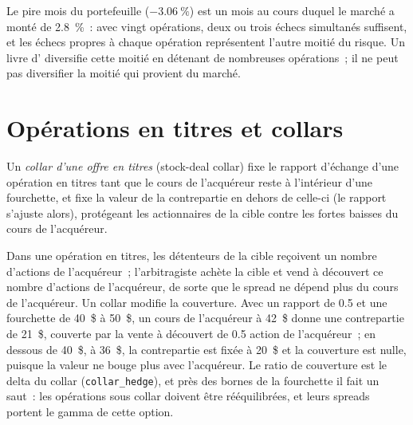 \begin{omfigure}

\label{fig:s1:merger-arbitrage:months}
\end{omfigure}

Le pire mois du portefeuille ($-3.06~\%$) est un mois au cours duquel le marché a monté de 2.8~\%~: avec vingt opérations, deux ou trois échecs simultanés suffisent, et
les échecs propres à chaque opération représentent l'autre moitié du risque. Un livre d' diversifie cette moitié en détenant de nombreuses opérations~; il ne peut pas diversifier la moitié qui
provient du marché.

\section{Opérations en titres et collars}

\begin{definition}\label{def:s1:merger-arbitrage:collar}
Un \emph{collar d'une offre en titres} (stock-deal collar) fixe le rapport d'échange d'une opération en titres tant que le cours de l'acquéreur reste à l'intérieur d'une fourchette, et fixe la
valeur de la contrepartie en dehors de celle-ci (le rapport s'ajuste alors), protégeant les actionnaires de la cible contre les fortes baisses du cours de l'acquéreur.
\end{definition}

Dans une opération en titres, les détenteurs de la cible reçoivent un nombre d'actions de l'acquéreur~; l'arbitragiste achète la cible et vend à découvert ce nombre d'actions de l'acquéreur,
de sorte que le spread ne dépend plus du cours de l'acquéreur. Un collar modifie la couverture. Avec un rapport de 0.5 et une fourchette de 40~\$ à 50~\$, un cours de l'acquéreur
à 42~\$ donne une contrepartie de 21~\$, couverte par la vente à découvert de 0.5 action de l'acquéreur~; en dessous de 40~\$, à 36~\$, la contrepartie est fixée à 20~\$ et la couverture est nulle, puisque
la valeur ne bouge plus avec l'acquéreur. Le ratio de couverture est le delta du collar (\texttt{collar\_hedge}), et près des bornes de la fourchette il fait un saut~: les opérations sous collar
doivent être rééquilibrées, et leurs spreads portent le gamma de cette option.


